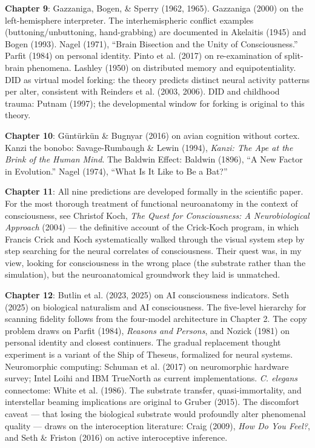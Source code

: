 \documentclass[11pt, twoside, openright]{book}
\begin{document}
\textbf{Chapter 9}: Gazzaniga, Bogen, \& Sperry (1962, 1965). Gazzaniga (2000) on the left-hemisphere interpreter. The interhemispheric conflict examples (buttoning/\allowbreak{}unbuttoning, hand-grabbing) are documented in Akelaitis (1945) and Bogen (1993). Nagel (1971), ``Brain Bisection and the Unity of Consciousness.'' Parfit (1984) on personal identity. Pinto et al. (2017) on re-examination of split-brain phenomena. Lashley (1950) on distributed memory and equipotentiality. DID as virtual model forking: the theory predicts distinct neural activity patterns per alter, consistent with Reinders et al. (2003, 2006). DID and childhood trauma: Putnam (1997); the developmental window for forking is original to this theory.

\textbf{Chapter 10}: Güntürkün \& Bugnyar (2016) on avian cognition without cortex. Kanzi the bonobo: Savage-Rumbaugh \& Lewin (1994), \textit{Kanzi: The Ape at the Brink of the Human Mind}. The Baldwin Effect: Baldwin (1896), ``A New Factor in Evolution.'' Nagel (1974), ``What Is It Like to Be a Bat?''

\textbf{Chapter 11}: All nine predictions are developed formally in the scientific paper. For the most thorough treatment of functional neuroanatomy in the context of consciousness, see Christof Koch, \textit{The Quest for Consciousness: A Neurobiological Approach} (2004) --- the definitive account of the Crick-Koch program, in which Francis Crick and Koch systematically walked through the visual system step by step searching for the neural correlates of consciousness. Their quest was, in my view, looking for consciousness in the wrong place (the substrate rather than the simulation), but the neuroanatomical groundwork they laid is unmatched.

\textbf{Chapter 12}: Butlin et al. (2023, 2025) on AI consciousness indicators. Seth (2025) on biological naturalism and AI consciousness. The five-level hierarchy for scanning fidelity follows from the four-model architecture in Chapter 2. The copy problem draws on Parfit (1984), \textit{Reasons and Persons}, and Nozick (1981) on personal identity and closest continuers. The gradual replacement thought experiment is a variant of the Ship of Theseus, formalized for neural systems. Neuromorphic computing: Schuman et al. (2017) on neuromorphic hardware survey; Intel Loihi and IBM TrueNorth as current implementations. \textit{C. elegans} connectome: White et al. (1986). The substrate transfer, quasi-immortality, and interstellar beaming implications are original to Gruber (2015). The discomfort caveat --- that losing the biological substrate would profoundly alter phenomenal quality --- draws on the interoception literature: Craig (2009), \textit{How Do You Feel?}, and Seth \& Friston (2016) on active interoceptive inference.
\end{document}
